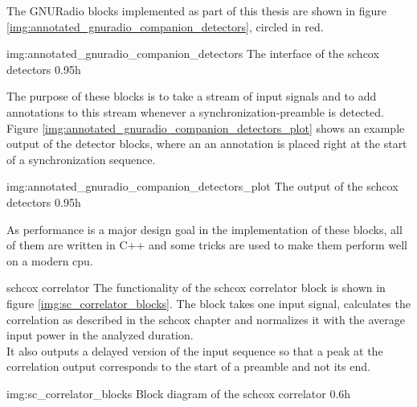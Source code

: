The GNURadio blocks implemented as part of this thesis are
shown in figure \ref{img:annotated_gnuradio_companion_detectors},
circled in red.

             {img:annotated_gnuradio_companion_detectors}
             {The interface of the \gls{schcox} detectors}
             {0.95}{h}

The purpose of these blocks is to take a stream of input signals
and to add annotations to this stream whenever a synchronization-preamble
is detected.
Figure \ref{img:annotated_gnuradio_companion_detectors_plot} shows an example output
of the detector blocks, where an an annotation is placed right at the start of a
synchronization sequence.

             {img:annotated_gnuradio_companion_detectors_plot}
             {The output of the \gls{schcox} detectors}
             {0.95}{h}

As performance is a major design goal in the implementation of these blocks,
all of them are written in C++ and some tricks are used to make them
perform well on a modern \acrshort{cpu}.

\begin{subchapter}{\acrlong{schcox} correlator}
  The functionality of the \acrlong{schcox} correlator
  block is shown in figure \ref{img:sc_correlator_blocks}.
  The block takes one input signal, calculates the correlation
  as described in the \acrlong{schcox} chapter and normalizes it
  with the average input power in the analyzed duration. \\

  It also outputs a delayed version of the input sequence so that
  a peak at the correlation output corresponds to the start of a
  preamble and not its end.

               {img:sc_correlator_blocks}
               {Block diagram of the \acrlong{schcox} correlator}
               {0.6}{h}


\end{subchapter}


